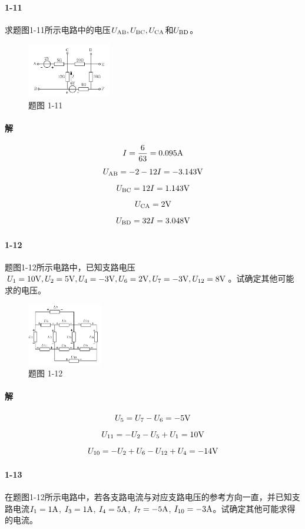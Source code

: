 \documentclass[hyperref, UTF8]{ctexart}
\begin{document}
\paragraph{1-11}\label{1-11}
求题图1-11所示电路中的电压$U_{\rm AB}, U_{\rm BC}, U_{\rm CA}$和$U_{\rm BD}$。
\begin{figure}[!htb]
  \centering
  \includegraphics[width=0.326\textwidth]{p1-11.png}
  \caption*{题图 1-11}
\end{figure}

\paragraph{解}
$$ I = \frac{6}{63}=0.095{\rm A} $$
$$ U_{\rm AB}=-2-12I=-3.143{\rm V} $$
$$ U_{\rm BC}=12I=1.143{\rm V} $$
$$ U_{\rm CA}=2{\rm V} $$
$$ U_{\rm BD}=32I=3.048{\rm V} $$

\paragraph{1-12}\label{1-12}
题图1-12所示电路中，已知支路电压$U_1=10{\rm V}, U_2=5{\rm V}, U_4=-3{\rm V}, U_6=2{\rm V}, U_7=-3{\rm V}, U_{12}=8{\rm V}$。试确定其他可能求的电压。

\begin{figure}[!htb]
  \centering
  \includegraphics[width=0.291\textwidth]{p1-12.png}
  \caption*{题图 1-12}
\end{figure}

\paragraph{解}
$$ U_5=U_7-U_6=-5{\rm V} $$
$$ U_{11}=-U_2-U_5+U_1=10{\rm V} $$
$$ U_{10}=-U_2+U_6-U_{12}+U_4=-14{\rm V} $$

\paragraph{1-13} \label{1-13}
在题图1-12所示电路中，若各支路电流与对应支路电压的参考方向一直，并已知支路电流$I_1=1{\rm A}$, $I_3=1{\rm A}$, $I_4=5{\rm A}$, $I_7=-5{\rm A}$, $I_{10}=-3{\rm A}$。试确定其他可能求得的电流。
\end{document}
